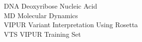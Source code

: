 DNA Deoxyribose Nucleic Acid\\
MD		Molecular Dynamics\\
VIPUR Variant Interpretation Using Rosetta\\
VTS VIPUR Training Set\\